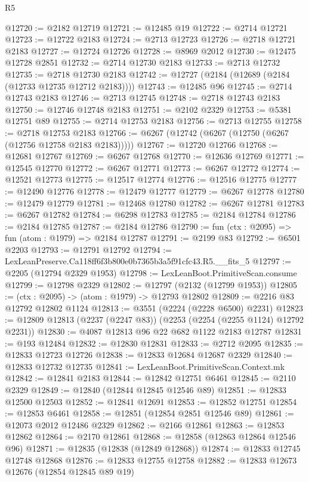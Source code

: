 \begin{lexlean}{R5}
\begin{coremodule}
@12720 := @2182 @12719
@12721 := @12485 @19
@12722 := @2714 @12721
@12723 := @12722 @2183
@12724 := @2713 @12723
@12726 := @2718 @12721 @2183
@12727 := @12724 @12726
@12728 := @8969 @2012
@12730 := @12475 @12728 @2851
@12732 := @2714 @12730 @2183
@12733 := @2713 @12732
@12735 := @2718 @12730 @2183
@12742 := @12727 (@2184 (@12689 (@2184 (@12733 @12735 @12712 @2183))))
@12743 := @12485 @96
@12745 := @2714 @12743 @2183
@12746 := @2713 @12745
@12748 := @2718 @12743 @2183
@12750 := @12746 @12748 @2183
@12751 := @2102 @2329
@12753 := @5381 @12751 @89
@12755 := @2714 @12753 @2183
@12756 := @2713 @12755
@12758 := @2718 @12753 @2183
@12766 := @6267 (@12742 (@6267 (@12750 (@6267 (@12756 @12758 @2183 @2183)))))
@12767 := @12720 @12766
@12768 := @12681 @12767
@12769 := @6267 @12768
@12770 := @12636 @12769
@12771 := @12545 @12770
@12772 := @6267 @12771
@12773 := @6267 @12772
@12774 := @12521 @12773
@12775 := @12517 @12774
@12776 := @12516 @12775
@12777 := @12490 @12776
@12778 := @12479 @12777
@12779 := @6267 @12778
@12780 := @12479 @12779
@12781 := @12468 @12780
@12782 := @6267 @12781
@12783 := @6267 @12782
@12784 := @6298 @12783
@12785 := @2184 @12784
@12786 := @2184 @12785
@12787 := @2184 @12786
@12790 := fun (ctx : @2095) => fun (atom : @1979) => @2184 @12787
@12791 := @2199 @83
@12792 := @6501 @2203
@12793 := @12791 @12792
@12794 := LexLeanPreserve.Ca118ff6f3b800e0b7365b3a5f91cfc43.R5.__fits_5
@12797 := @2205 (@12794 @2329 @1953)
@12798 := LexLeanBoot.PrimitiveScan.consume
@12799 := @12798 @2329
@12802 := @12797 (@2132 (@12799 @1953))
@12805 := (ctx : @2095) -> (atom : @1979) -> @12793 @12802
@12809 := @2216 @83 @12792 @12802 @1124
@12813 := @3551 (@2224 (@2228 @6500) @2231)
@12823 := @12809 @12813 (@2237 (@2247 @83)) (@2253 (@2254 (@2255 @1124) @12792 @2231))
@12830 := @4087 @12813 @96 @22 @682 @1122 @2183 @12787
@12831 := @193 @12484
@12832 := @12830 @12831
@12833 := @2712 @2095
@12835 := @12833 @12723 @12726
@12838 := @12833 @12684 @12687 @2329
@12840 := @12833 @12732 @12735
@12841 := LexLeanBoot.PrimitiveScan.Context.mk
@12842 := @12841 @2183
@12844 := @12842 @12751 @6461
@12845 := @2110 @2329
@12849 := @12840 (@12844 @12845 @12546 @89)
@12851 := @12833 @12500 @12503
@12852 := @12841 @12691
@12853 := @12852 @12751
@12854 := @12853 @6461
@12858 := @12851 (@12854 @2851 @12546 @89)
@12861 := @12073 @2012 @12486 @2329
@12862 := @2166 @12861
@12863 := @12853 @12862
@12864 := @2170 @12861
@12868 := @12858 (@12863 @12864 @12546 @96)
@12871 := @12835 (@12838 (@12849 @12868))
@12874 := @12833 @12745 @12748 @12868
@12876 := @12833 @12755 @12758
@12882 := @12833 @12673 @12676 (@12854 @12845 @89 @19)

\end{coremodule}
\end{lexlean}
